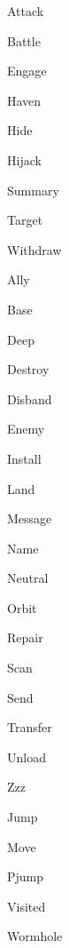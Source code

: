 \documentclass[10pt,titlepage]{article}
\begin{document}
\begin{description}
 \item[Combat section:]  
  \setlength{\itemsep}{1pt}
  \setlength{\parskip}{0pt}
  \setlength{\parsep}{0pt}
  \item Attack
  \item Battle
  \item Engage
  \item Haven
  \item Hide
  \item Hijack
  \item Summary
  \item Target
  \item Withdraw
\end{description}
\begin{description}
    \item[Pre-departure section:]
  \setlength{\itemsep}{1pt}
  \setlength{\parskip}{0pt}
  \setlength{\parsep}{0pt}
	\item Ally
	\item Base
	\item Deep
	\item Destroy
	\item Disband
	\item Enemy
	\item Install
	\item Land
	\item Message
	\item Name
	\item Neutral
	\item Orbit
	\item Repair
	\item Scan
	\item Send
	\item Transfer
	\item Unload
	\item Zzz
\end{description}
\begin{description}
    \item[Jump section:]
  \setlength{\itemsep}{1pt}
  \setlength{\parskip}{0pt}
  \setlength{\parsep}{0pt}
	\item Jump
	\item Move
	\item Pjump
	\item Visited
	\item Wormhole
\end{description}
\end{document}
